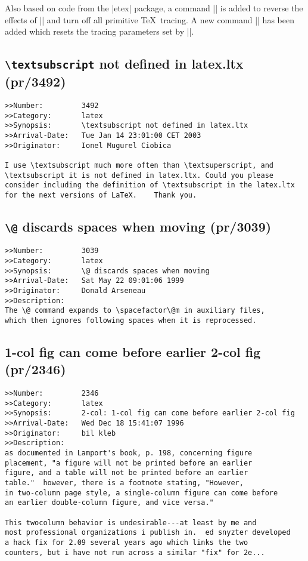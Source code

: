 \documentclass{ltxguide}
\begin{document}
Also based on code from the |etex| package, a command |\tracingnone|
is added to reverse the effects of |\tracingall| and turn off all primitive
\TeX\ tracing. A new command |\hideoutput| has been  added which resets the
tracing parameters set by |\showoutput|.




\subsection{\texttt{\textbackslash textsubscript} not defined in
   latex.ltx (pr/3492)}

\begin{verbatim}
>>Number:         3492
>>Category:       latex
>>Synopsis:       \textsubscript not defined in latex.ltx
>>Arrival-Date:   Tue Jan 14 23:01:00 CET 2003
>>Originator:     Ionel Mugurel Ciobica

I use \textsubscript much more often than \textsuperscript, and
\textsubscript it is not defined in latex.ltx. Could you please
consider including the definition of \textsubscript in the latex.ltx
for the next versions of LaTeX.    Thank you.
\end{verbatim}

\subsection{\texttt{\textbackslash @} discards spaces when moving
            (pr/3039)}

\begin{verbatim}
>>Number:         3039
>>Category:       latex
>>Synopsis:       \@ discards spaces when moving
>>Arrival-Date:   Sat May 22 09:01:06 1999
>>Originator:     Donald Arseneau
>>Description:
The \@ command expands to \spacefactor\@m in auxiliary files,
which then ignores following spaces when it is reprocessed.
\end{verbatim}

\subsection{1-col fig can come before earlier 2-col fig
           (pr/2346)}

\begin{verbatim}
>>Number:         2346
>>Category:       latex
>>Synopsis:       2-col: 1-col fig can come before earlier 2-col fig
>>Arrival-Date:   Wed Dec 18 15:41:07 1996
>>Originator:     bil kleb
>>Description:
as documented in Lamport's book, p. 198, concerning figure
placement, "a figure will not be printed before an earlier
figure, and a table will not be printed before an earlier
table."  however, there is a footnote stating, "However,
in two-column page style, a single-column figure can come before
an earlier double-column figure, and vice versa."

This twocolumn behavior is undesirable---at least by me and
most professional organizations i publish in.  ed snyzter developed
a hack fix for 2.09 several years ago which links the two
counters, but i have not run across a similar "fix" for 2e...
\end{verbatim}
\end{document}
